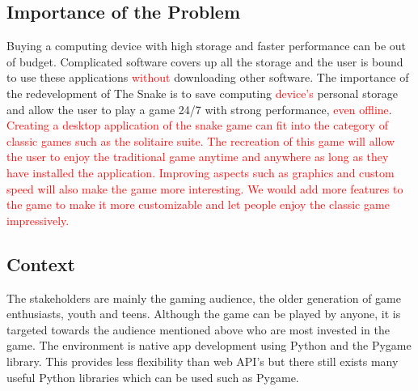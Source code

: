 \documentclass{article}
\begin{document}
\subsection*{Importance of the Problem}

Buying a computing device with high storage and faster performance can be out of budget. Complicated software covers up all the storage and the user is bound to use these applications \textcolor{red}{without} downloading other software. The importance of the redevelopment of The Snake is to save computing \textcolor{red}{device's} personal storage and allow the user to play a game 24/7 with strong performance, \textcolor{red}{even offline}. \textcolor{red}{ Creating a desktop application of the snake game can fit into the category of classic games such as the solitaire suite. The recreation of this game will allow the user to enjoy the traditional game anytime and anywhere as long as they have installed the application. Improving aspects such as graphics and custom speed will also make the game more interesting. We would add more features to the game to make it more customizable and let people enjoy the classic game impressively.}


\subsection*{Context}
The stakeholders are mainly the gaming audience, the older generation of game enthusiasts, youth and teens. Although the game can be played by anyone, it is targeted towards the audience mentioned above who are most invested in the game. The environment is native app development using Python and the Pygame library. This provides less flexibility than web API's but there still exists many useful Python libraries which can be used such as Pygame. 
\end{document}
